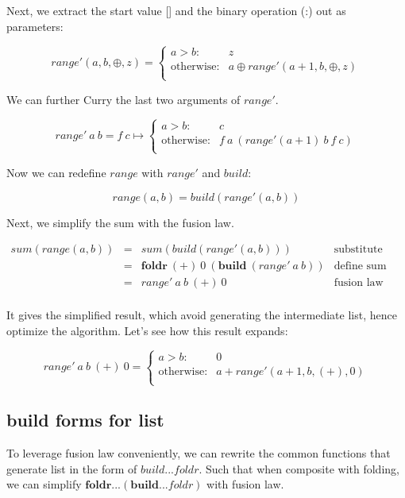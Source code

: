 \documentclass{article}
\begin{document}
Next, we extract the start value [] and the binary operation (:) out as parameters:

\[
range'(a, b, \oplus, z) =
  \begin{cases}
  a > b: & z \\
  \text{otherwise}: & a \oplus range'(a+1, b, \oplus, z) \\
  \end{cases}
\]

We can further Curry the last two arguments of $range'$.

\[
range'\ a\ b = f\ c \mapsto
  \begin{cases}
  a > b: & c \\
  \text{otherwise}: & f\ a\ (range' (a+1)\ b\ f\ c) \\
  \end{cases}
\]

Now we can redefine $range$ with $range'$ and $build$:

\[
range(a, b) = build(range'(a, b))
\]

Next, we simplify the sum with the fusion law.

\[
\begin{array}{rcll}
sum(range(a, b)) & = & sum(build(range'(a, b))) & \text{substitute} \\
  & = & \pmb{foldr}\ (+)\ 0\ (\pmb{build}\ (range'\ a\ b)) & \text{define sum with foldr} \\
  & = & range'\ a\ b\ (+)\ 0 & \text{fusion law} \\
\end{array}
\]

It gives the simplified result, which avoid generating the intermediate list, hence optimize the algorithm. Let's see how this result expands:

\[
range'\ a\ b\ (+)\ 0 =
  \begin{cases}
  a > b: & 0 \\
  \text{otherwise}: & a + range'(a+1, b, (+), 0) \\
  \end{cases}
\]

\subsection{build forms for list}

To leverage fusion law conveniently, we can rewrite the common functions that generate list in the form of $build...foldr$. Such that when composite with folding, we can simplify $\pmb{foldr}...(\pmb{build}...foldr)$ with fusion law.
\end{document}
